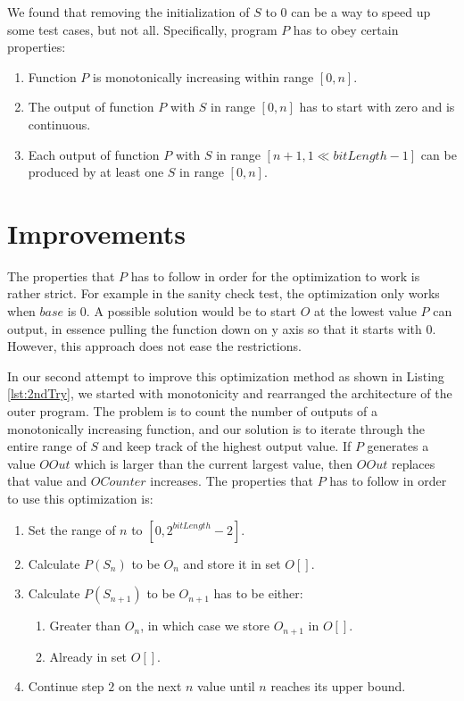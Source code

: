 We found that removing the initialization of $S$ to $0$ can be a way to speed up some test cases, but not all. Specifically, program $P$ has to obey certain properties:

\begin{enumerate}
\item Function $P$ is monotonically increasing within range $[0, n]$.
\item The output of function $P$ with $S$ in range $[0, n]$ has to start with zero and is continuous.
\item Each output of function $P$ with $S$ in range $[n+1, 1\ll bitLength-1]$ can be produced by at least one $S$ in range $[0, n]$.
\end{enumerate}

\section{Improvements}
The properties that $P$ has to follow in order for the optimization to work is rather strict. For example in the sanity check test, the optimization only works when $base$ is $0$. A possible solution would be to start $O$ at the lowest value $P$ can output, in essence pulling the function down on y axis so that it starts with $0$. However, this approach does not ease the restrictions.

In our second attempt to improve this optimization method as shown in Listing \ref{lst:2ndTry}, we started with monotonicity and rearranged the architecture of the outer program. The problem is to count the number of outputs of a monotonically increasing function, and our solution is to iterate through the entire range of $S$ and keep track of the highest output value. If $P$ generates a value $OOut$ which is larger than the current largest value, then $OOut$ replaces that value and $OCounter$ increases. The properties that $P$ has to follow in order to use this optimization is:

\begin{enumerate}
\item Set the range of $n$ to $[0, 2^{bitLength}-2]$.
\item Calculate $P(S_{n})$ to be $O_{n}$ and store it in set $O[]$.
\item Calculate $P(S_{n+1})$ to be $O_{n+1}$ has to be either:
	\begin{enumerate}
		\item Greater than $O_{n}$, in which case we store $O_{n+1}$ in $O[]$.
		\item Already in set $O[]$.
	\end{enumerate}
\item Continue step $2$ on the next $n$ value until $n$ reaches its upper bound.
\end{enumerate}

